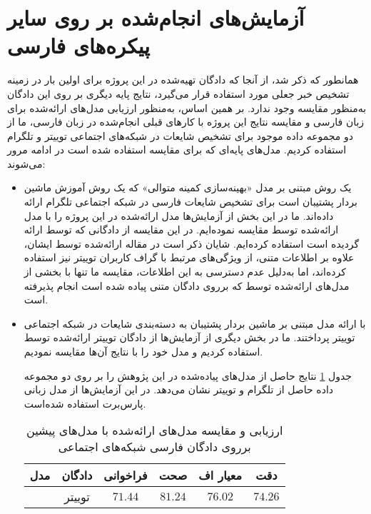 \section{آزمایش‌های انجام‌شده بر روی سایر پیکره‌های فارسی}
همانطور که ذکر شد، از آنجا که دادگان تهیه‌شده در این پروژه برای اولین بار در زمینه تشخیص خبر جعلی مورد استفاده قرار می‌گیرد، نتایج پایه دیگری بر روی این دادگان به‌منظور مقایسه وجود ندارد. بر همین اساس، به‌‌منظور ارزیابی مدل‌های ارائه‌شده برای زبان فارسی و مقایسه نتایج این پروژه با کارهای قبلی انجام‌شده در زبان فارسی، ما از دو مجموعه داده موجود برای تشخیص شایعات در شبکه‌های اجتماعی توییتر و تلگرام استفاده کردیم. مدل‌های پایه‌ای که برای مقایسه استفاده شده ‌است در ادامه مرور می‌شوند:
\begin{itemize}
\item
\cite{zamani2017rumor}
یک روش مبتنی‌ بر مدل «بهینه‌سازی کمینه متوالی» که یک روش آموزش ماشین بردار پشتیبان است برای تشخیص شایعات فارسی در شبکه اجتماعی تلگرام ارائه داده‌اند. ما در این بخش از آزمایش‌ها مدل ارائه‌شده در این پروژه را با مدل ارائه‌شده توسط \cite{zamani2017rumor} مقایسه نموده‌ایم. در این مقایسه از دادگانی که توسط \cite{zamani2017rumor} ارائه گردیده است استفاده کرده‌ایم. شایان ذکر است در مقاله ارائه‌شده توسط ایشان، علاوه بر اطلاعات متنی، از ویژگی‌های مرتبط با گراف کاربران توییتر نیز استفاده کرده‌اند، اما به‌دلیل عدم دسترسی به این اطلاعات، مقایسه ما تنها با بخشی از مدل‌های ارائه‌شده توسط \cite{zamani2017rumor}  که برروی دادگان متنی پیاده شده است  انجام پذیرفته ‌است.

\item
\citet{jahanbakhsh2020model}
با ارائه مدل مبتنی‌ بر ماشین بردار پشتیبان به دسته‌بندی شایعات در شبکه اجتماعی توییتر پرداختند. ما در بخش دیگری از آزمایش‌ها از دادگان توییتر ارائه‌شده توسط \citet{jahanbakhsh2020model} استفاده کردیم و مدل خود را با نتایج آن‌ها مقایسه نمودیم.

جدول \ref{table.comparison} نتایج حاصل از مدل‌های پیاده‌شده در این پژوهش را بر روی دو مجموعه داده حاصل از تلگرام و توییتر نشان می‌دهد. در این آزمایش‌ها از مدل زبانی پارس‌برت استفاده شده‌است.


\begin{table}
	\caption{ارزیابی و مقایسه مدل‌های ارائه‌شده با مدل‌های پیشین برروی دادگان فارسی شبکه‌های اجتماعی}
	\label{table.comparison}
	\begin{center}
		\begin{tabular}{|c|c|c|c|c|c|}
			\hline
			مدل & دادگان & فراخوانی & صحت & معیار اف & دقت \\
			\hline
			\hline
			\citep{zamani2017rumor} & 
			\multirow{4}{*}{توییتر} &$71.44$&$81.24$& $76.02$ & $74.26$ \\
			

\end{tabular}
\end{center}
\end{table}
\end{itemize}
